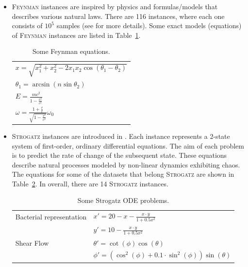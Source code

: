 \documentclass[a4paper,12pt]{elsarticle}
\begin{document}
\begin{itemize}
	\item \textsc{Feynman} instances are inspired by physics and formulas/models that describes various natural laws.  
	There are 116 instances, where each one consists of $10^5$  samples (see \cite{udrescu2020ai} for more details). Some exact models (equations) of \textsc{Feynman} instances are listed in Table~\ref{tab:Feynamn-Eq}.  
	
	\begin{table}[!ht]
		\centering
		\begin{tabular}{l}   \hline
			$x = \sqrt{x_1^2 + x_2^2 - 2 x_1 x_2 \cos(\theta_1 - \theta_2)}$ \\
			$ \theta_1 = \arcsin(n \sin \theta_2)$ \\
			$E =  \frac{m c^2 }{1 - \frac{v^2}{c^2}}$ \\
			$\omega = \frac{1 + \frac{v}{c}}{ \sqrt{1 - \frac{v^2}{c^2}}} \omega_0$ \\ \hline
			
		\end{tabular}
		\caption{Some Feynman equations.}
		\label{tab:Feynamn-Eq}
	\end{table}
	
	
	\item \textsc{Strogatz} instances are introduced in \cite{la2016inference}. 
	Each instance represents a 2-state system of first-order, ordinary differential equations. 
	The aim of each problem is to predict the rate of change of the subsequent state. These equations describe natural processes modeled by non-linear dynamics exhibiting chaos.  The equations for some of the datasets that belong \textsc{Strogatz} are shown in Table~\ref{table:strogatz-ODEs}. In overall, there are 14 \textsc{Strogatz} instances. 
	
	
	\begin{table}
		\centering
		\begin{tabular}{ll} \\ \hline
			Bacterial representation &   $x' = 20 - x - \frac{x \cdot y}{1 + 0.5 x^2 }$ \\ 
			&   $y' = 10 - \frac{x \cdot y}{1 + 0.5 x^2  }$ \\ \hline
			Shear Flow               &  $\theta' = \cot(\phi)\cos(\theta)$ \\
			&  $ \phi'  = ( \cos^2(\phi) + 0.1 \cdot \sin^2 (\phi)) \sin(\theta) $ \\ \hline
		\end{tabular}
		\caption{Some Strogatz ODE problems.}
		\label{table:strogatz-ODEs}
	\end{table}
	
\end{itemize}
\end{document}
